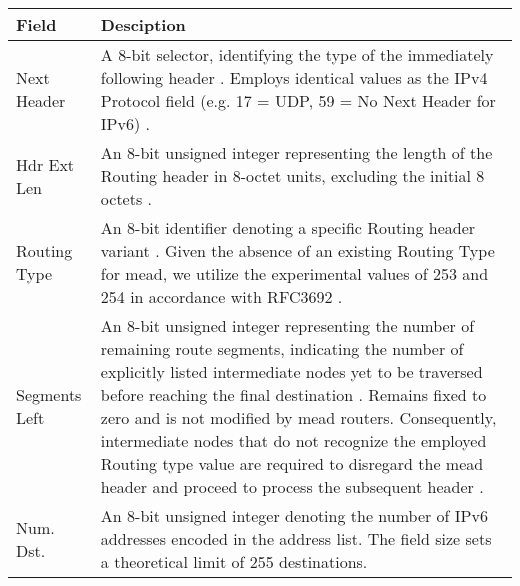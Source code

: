 \bgroup
\begin{table}[!htbp]
\centering
\def\arraystretch{1.35}%
\setlength{\tabcolsep}{1.2em}
\begin{tabularx}{\textwidth}{lX}
\toprule
\textbf{Field}& \textbf{Desciption} \\
\midrule
Next Header   & A 8-bit selector, identifying the type of the immediately
                following header \cite{rfc8200_ipv6_hdr}.
                Employs identical values as the IPv4 Protocol field (e.g. 17 =
                UDP, 59 = No Next Header for IPv6)
                \cite{iana_prot_nums}.\\
Hdr Ext Len   & An 8-bit unsigned integer representing the length of the
                Routing header in 8-octet units, excluding the initial 8
                octets \cite{rfc8200_ipv6_hdr}. \\
Routing Type  & An 8-bit identifier denoting a specific Routing header variant
                \cite{rfc8200_ipv6_hdr}.
                Given the absence of an existing Routing Type for \gls{mead}, we
                utilize the experimental values of 253 and 254 in accordance
                with RFC3692 \cite{rfc3692_ipv6_rt_type}.\\
Segments Left & An 8-bit unsigned integer representing the number of remaining
                route segments, indicating the number of explicitly listed
                intermediate nodes yet to be traversed before reaching the
                final destination \cite{rfc8200_ipv6_hdr}.
                Remains fixed to zero and is not modified by \gls{mead} routers.
                Consequently, intermediate nodes that do not recognize the
                employed Routing type value are required to disregard the
                \gls{mead} header and proceed to process the subsequent header
                \cite{rfc8200_ipv6_hdr}.\\
Num. Dst.     & An 8-bit unsigned integer denoting the number of IPv6
                addresses encoded in the address list.
                The field size sets a theoretical limit of 255 destinations.\\

\end{tabularx}
\end{table}
